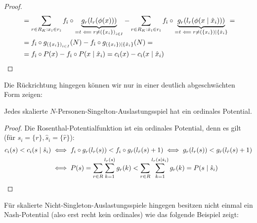 \begin{proof}
\begin{align*}
	&=\sum_{r \in R_K: x_{\hat{\imath}} \in r_{\hat{\imath}}} f_{\hat{\imath}} \circ \underbrace{g_r(l_r(\phi(x)))}_{= t \impliedby r \neq \left(\{x_i\}\right)_{i \in I}} -
	\sum_{r \in R_K: \hat{x}_{\hat{\imath}} \in r_{\hat{\imath}}} f_{\hat{\imath}} \circ \underbrace{g_r(l_r(\phi(x \mid \hat{x}_i)))}_{= t \impliedby r \neq \left(\{x_i\}\right)\mid\{\hat{x}_i\}} = \\
	&=f_{\hat{\imath}} \circ g_{\left(\{x_i\}\right)_{i \in I}}(N) - f_{\hat{\imath}} \circ g_{\left(\{x_i\}\right)\mid\{\hat{x}_i\}}(N) = \\
	&=f_{\hat{\imath}} \circ P(x) - f_{\hat{\imath}} \circ P(x \mid \hat{x}_i) = c_{\hat{\imath}}(x) - c_{\hat{\imath}}(x \mid \hat{x}_i)	\qedhere							
	\end{align*}
\end{proof}

Die Rückrichtung hingegen können wir nur in einer deutlich abgeschwächten Form zeigen:

\begin{satz}
	Jedes skalierte $N$-Personen-Singelton-Auslastungsspiel hat ein ordinales Potential.
\end{satz}

\begin{proof}
	Die Rosenthal-Potentialfunktion ist ein ordinales Potential, denn es gilt (für $s_i = \{r\}, \hat{s}_i = \{\hat{r}\}$):
	\begin{align*}
	c_i(s) < c_i(s \mid \hat{s}_i) &\iff f_i\circ g_r(l_r(s)) < f_i\circ g_{\hat{r}}(l_{\hat{r}}(s)+1) \iff g_r(l_r(s)) < g_{\hat{r}}(l_{\hat{r}}(s)+1) \\
	&\iff P(s) = \sum_{r \in R}\sum_{k=1}^{l_r(s)} g_r(k) < \sum_{r \in R}\sum_{k=1}^{l_r(s\mid \hat{s}_i)} g_r(k) = P(s\mid \hat{s}_i) \qedhere
	\end{align*}
\end{proof}

Für skalierte Nicht-Singleton-Auslastungsspiele hingegen besitzen nicht einmal ein Nash-Potential (also erst recht kein ordinales) wie das folgende Beispiel zeigt:

